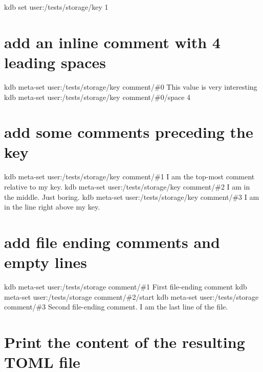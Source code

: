 kdb set \textquotesingle{}user\+:/tests/storage/key\textquotesingle{} \textquotesingle{}1\textquotesingle{}\hypertarget{autotoc_md635_autotoc_md722}{}\section{add an inline comment with 4 leading spaces}\label{autotoc_md635_autotoc_md722}
kdb meta-\/set \textquotesingle{}user\+:/tests/storage/key\textquotesingle{} \textquotesingle{}comment/\#0\textquotesingle{} \textquotesingle{} This value is very interesting\textquotesingle{} kdb meta-\/set \textquotesingle{}user\+:/tests/storage/key\textquotesingle{} \textquotesingle{}comment/\#0/space\textquotesingle{} \textquotesingle{}4\textquotesingle{}\hypertarget{autotoc_md635_autotoc_md723}{}\section{add some comments preceding the key}\label{autotoc_md635_autotoc_md723}
kdb meta-\/set \textquotesingle{}user\+:/tests/storage/key\textquotesingle{} \textquotesingle{}comment/\#1\textquotesingle{} \textquotesingle{} I am the top-\/most comment relative to my key.\textquotesingle{} kdb meta-\/set \textquotesingle{}user\+:/tests/storage/key\textquotesingle{} \textquotesingle{}comment/\#2\textquotesingle{} \textquotesingle{} I am in the middle. Just boring.\textquotesingle{} kdb meta-\/set \textquotesingle{}user\+:/tests/storage/key\textquotesingle{} \textquotesingle{}comment/\#3\textquotesingle{} \textquotesingle{} I am in the line right above my key.\textquotesingle{}\hypertarget{autotoc_md635_autotoc_md724}{}\section{add file ending comments and empty lines}\label{autotoc_md635_autotoc_md724}
kdb meta-\/set \textquotesingle{}user\+:/tests/storage\textquotesingle{} \textquotesingle{}comment/\#1\textquotesingle{} \textquotesingle{} First file-\/ending comment\textquotesingle{} kdb meta-\/set \textquotesingle{}user\+:/tests/storage\textquotesingle{} \textquotesingle{}comment/\#2/start\textquotesingle{} \textquotesingle{}\textquotesingle{} kdb meta-\/set \textquotesingle{}user\+:/tests/storage\textquotesingle{} \textquotesingle{}comment/\#3\textquotesingle{} \textquotesingle{} Second file-\/ending comment. I am the last line of the file.\textquotesingle{}\hypertarget{autotoc_md635_autotoc_md725}{}\section{Print the content of the resulting T\+O\+M\+L file}\label{autotoc_md635_autotoc_md725}
